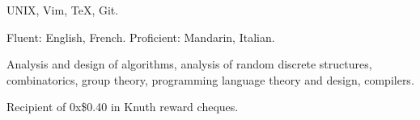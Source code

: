 \par
\noindent UNIX, Vim, \TeX, Git.
\medskip

\par
\noindent Fluent: English, French. Proficient: Mandarin, Italian.
\medskip


\noindent Analysis and design of algorithms, analysis of random discrete structures, combinatorics, group theory,
programming language theory and design, compilers.


\noindent Recipient of 0x\$0.40 in Knuth reward cheques.

\bye

